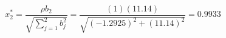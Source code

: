 

\[
x_{2}^{*} = \frac{\rho b_2}{\sqrt{\sum_{j=1}^{2}{b_{j}^2}}} = \frac{(1)(11.14)}{\sqrt{(-1.2925)^2 + (11.14)^2}} = 0.9933

\]


